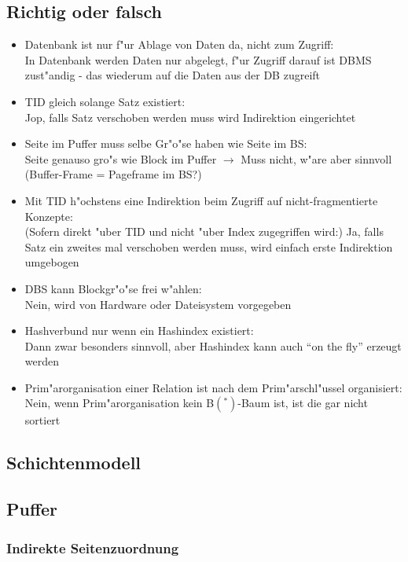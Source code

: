 \documentclass[a4paper, 12pt]{scrartcl}
\begin{document}
\subsection{Richtig oder falsch}
\begin{itemize}
	\item
		Datenbank ist nur f"ur Ablage von Daten da, nicht zum Zugriff:\\
		In Datenbank werden Daten nur abgelegt, f"ur Zugriff darauf ist DBMS zust"andig - das wiederum auf die Daten aus der DB zugreift
	\item
		TID gleich solange Satz existiert:\\
		Jop, falls Satz verschoben werden muss wird Indirektion eingerichtet
	\item
		Seite im Puffer muss selbe Gr"o"se haben wie Seite im BS:\\
		Seite genauso gro"s wie Block im Puffer  $\rightarrow$ Muss nicht, w"are aber sinnvoll (Buffer-Frame = Pageframe im BS?)
	\item
		Mit TID h"ochstens eine Indirektion beim Zugriff auf nicht-fragmentierte Konzepte:\\
		(Sofern direkt "uber TID und nicht "uber Index zugegriffen wird:) Ja, falls Satz ein zweites mal verschoben werden muss, wird einfach erste Indirektion umgebogen
	\item
		DBS kann Blockgr"o"se frei w"ahlen:\\
		Nein, wird von Hardware oder Dateisystem vorgegeben
	\item
		Hashverbund nur wenn ein Hashindex existiert:\\
		Dann zwar besonders sinnvoll, aber Hashindex kann auch \enquote{on the fly} erzeugt werden
	\item
		Prim"arorganisation einer Relation ist nach dem Prim"arschl"ussel organisiert:\\
		Nein, wenn Prim"arorganisation kein B$(^*)$-Baum ist, ist die gar nicht sortiert
\end{itemize}
\subsection{Schichtenmodell}
\subsection{Puffer}
\subsubsection{Indirekte Seitenzuordnung}
\end{document}
